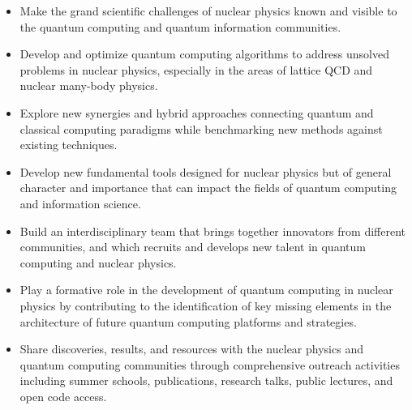 \documentclass[11pt]{article}
\begin{document}
\begin{itemize}

\item Make the grand scientific challenges of nuclear physics known and visible to the quantum computing and quantum information communities.

\item  Develop and optimize quantum computing algorithms to address unsolved problems in nuclear physics, especially in the areas of lattice QCD and nuclear many-body physics.

\item  Explore new synergies and hybrid approaches connecting quantum and classical computing paradigms while benchmarking new methods against existing techniques.

\item Develop new fundamental tools designed for nuclear physics but of general character and importance that can impact the fields of quantum computing and information science.

\item  Build an interdisciplinary team
that brings together innovators from different communities, and which recruits and develops new talent in quantum computing and nuclear physics.

\item  Play a formative role in the development of quantum computing in nuclear physics by contributing to the identification of key missing elements in the architecture of future quantum computing platforms and strategies.

\item  Share discoveries, results, and resources with the nuclear physics and quantum computing communities
through comprehensive outreach activities including summer schools, publications, research talks, public lectures, and open code access.
\end{itemize}
%
\end{document}
